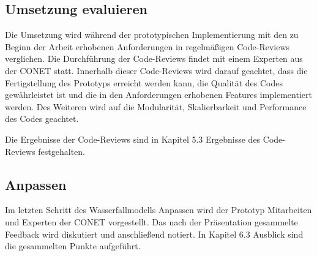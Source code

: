 \subsection{Umsetzung evaluieren}
Die Umsetzung wird während der prototypischen Implementierung mit den zu Beginn der Arbeit erhobenen Anforderungen in regelmäßigen Code-Reviews verglichen. Die Durchführung der Code-Reviews findet mit einem Experten aus der CONET statt. Innerhalb dieser Code-Reviews wird darauf geachtet, dass die Fertigstellung des Prototyps erreicht werden kann, die Qualität des Codes gewährleistet ist und die in den Anforderungen erhobenen Features implementiert werden. Des Weiteren wird auf die Modularität, Skalierbarkeit und Performance des Codes geachtet.

Die Ergebnisse der Code-Reviews sind in Kapitel 5.3 \glqq Ergebnisse des Code-Reviews\grqq{} festgehalten. 

\subsection{Anpassen}
Im letzten Schritt des Wasserfallmodells \glqq Anpassen\grqq{} wird der Prototyp Mitarbeiten und Experten der CONET vorgestellt. Das nach der Präsentation gesammelte Feedback wird diskutiert und anschließend notiert. In Kapitel 6.3 \glqq Ausblick\grqq{} sind die gesammelten Punkte aufgeführt. 